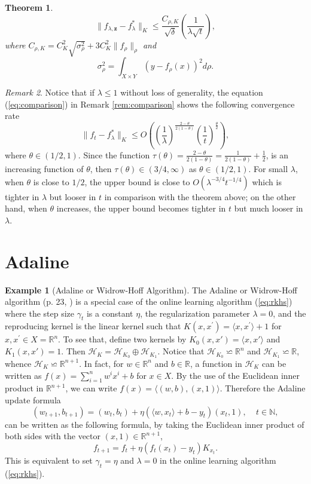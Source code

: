 \documentclass[twoside]{amsart}
\theoremstyle{theorem}
\newtheorem{thm}{Theorem}[section]
\theoremstyle{definition}
\newtheorem{exmp}{Example}[section]
\theoremstyle{remark}
\newtheorem{rem}[thm]{Remark}
\def\H{{\mathscr H}}
\def\N{{\mathbb N}}
\def\z{{\mathbf z}}
\newcommand{\DS}{\displaystyle}
\def\R{{\mathbb R}}        %
\def\<{{\langle}}
\def\>{{\rangle}}
\begin{document}
\begin{thm}
\[ \| f_{\lambda,\z} - f^\ast_\lambda \|_K \leq \frac{C_{\rho,K}}{\sqrt{\delta}} \left(\frac{1}{\lambda\sqrt{t}} \right), \]
where $C_{\rho,K}=C^2_K \sqrt{\sigma^2_\rho} + 3 C^2_K \|f_\rho\|_\rho$ and
\[ \sigma_\rho^2 = \int_{X\times Y} (y- f_\rho(x))^2 d \rho. \]
\end{thm}

\begin{rem}
Notice that if $\lambda\leq 1$ without loss of generality, the equation (\ref{eq:comparison}) in Remark \ref{rem:comparison} shows
the following convergence rate
\[ \|f_t - f^\ast_\lambda\|_K \leq O\left( \left(\frac{1}{\lambda} \right)^{\frac{2-\theta}{2(1-\theta)}}
\left(\frac{1}{t}\right)^{\frac{\theta}{2}} \right), \]
where $\theta\in (1/2,1)$. Since the function $\DS \tau(\theta)=\frac{2-\theta}{2(1-\theta)}=\frac{1}{2(1-\theta)}+\frac{1}{2}$, is
an increasing function of $\theta$, then $\DS \tau(\theta) \in (3/4,\infty)$ as $\theta \in (1/2,1)$.
For small $\lambda$, when $\theta$ is close to $1/2$, the upper bound is close to $O(\lambda^{-3/4} t^{-1/4})$ which is tighter in
$\lambda$ but looser in $t$ in comparison with the theorem above; on the other hand, when $\theta$
increases, the upper bound becomes tighter in $t$ but much looser in $\lambda$.
\end{rem}



\section{Adaline}


\begin{exmp}[Adaline or Widrow-Hoff Algorithm] The Adaline or Widrow-Hoff algorithm (p. 23, \cite{CriSha00})
is a special case of the online learning algorithm (\ref{eq:rkhs}) where the step size $\gamma_t$ is a constant $\eta$, the regularization parameter
$\lambda=0$, and the reproducing kernel is the linear kernel such that $K(x,x^\prime)= \< x, x^\prime\> + 1$ for $x,x^\prime\in X=\R^n$.
To see that, define two kernels by $K_0(x,x')=\<x,x'\>$ and $K_1(x,x')=1$. Then $\H_{K}=\H_{K_0}\oplus \H_{K_1}$. Notice
that $\H_{K_0}\backsimeq \R^n$ and $\H_{K_1}\backsimeq \R$, whence $\H_K \backsimeq \R^{n+1}$. In fact, for $w\in \R^n$ and $b\in \R$,
a function in $\H_K$ can be written as $f(x)=\sum_{i=1}^n w^i x^i + b $ for $x\in X$. By the use of the Euclidean inner product in $\R^{n+1}$, we
can write $f(x)=\<(w,b),(x,1)\>$. Therefore the Adaline
update formula
\[ (w_{t+1}, b_{t+1}) = (w_t, b_t) + \eta ( \< w, x_t \> + b - y_t ) (x_t,1), \ \ \ \ \ t\in \N, \]
can be written as the following formula, by taking the Euclidean inner product of both sides with the vector $(x,1)\in \R^{n+1}$,
\[ f_{t+1} = f_t + \eta (f_t(x_t) - y_t) K_{x_t}. \]
This is equivalent to set $\gamma_t=\eta$ and $\lambda=0$ in the online learning algorithm (\ref{eq:rkhs}).
\end{exmp}
\end{document}
